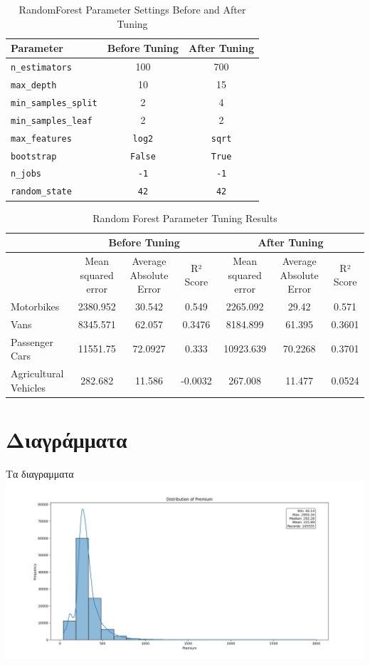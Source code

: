 \documentclass{llncs}
\begin{document}
\begin{table}[ht]
    \centering
    \begin{tabular}{l|cc}
        \hline
        Parameter & Before Tuning & After Tuning \\
        \hline
        \texttt{n\_estimators} & 100 & 700 \\
        \texttt{max\_depth} & 10 & 15 \\
        \texttt{min\_samples\_split} & 2 & 4 \\
        \texttt{min\_samples\_leaf} & 2 & 2 \\
        \texttt{max\_features} & \texttt{log2} & \texttt{sqrt} \\
        \texttt{bootstrap} & \texttt{False} & \texttt{True} \\
        \texttt{n\_jobs} & \texttt{-1} & \texttt{-1} \\
        \texttt{random\_state} & \texttt{42} & \texttt{42} \\
        \hline
    \end{tabular}
    \caption{RandomForest Parameter Settings Before and After Tuning}
\end{table}

\begin{table}[ht]
    \centering
    \begin{tabular}{lccc|ccc}
        \hline
        & \multicolumn{3}{c}{Before Tuning} & \multicolumn{3}{c}{After Tuning} \\
        \hline
        & Mean squared error & Average Absolute Error & R² Score & Mean squared error & Average Absolute Error & R² Score \\
        \hline
        Motorbikes & 2380.952 & 30.542 & 0.549 & 2265.092 & 29.42 & 0.571 \\
        Vans & 8345.571 & 62.057 & 0.3476 & 8184.899 & 61.395 & 0.3601 \\
        Passenger Cars & 11551.75 & 72.0927 & 0.333 & 10923.639 & 70.2268 & 0.3701 \\
        Agricultural Vehicles & 282.682 & 11.586 & -0.0032 & 267.008 & 11.477 & 0.0524 \\
        \hline
    \end{tabular}
    \caption{Random Forest Parameter Tuning Results}
\end{table}


\section{Διαγράμματα}
Τα διαγραμματα
\includegraphics[width=1\textwidth, keepaspectratio]{images/premium.png}
\end{document}
